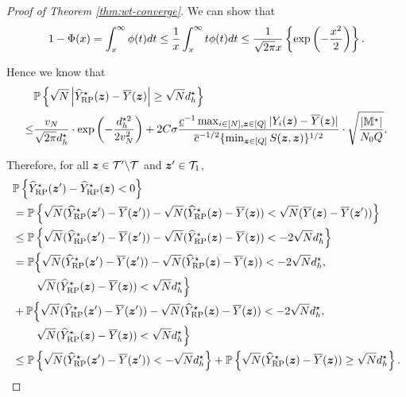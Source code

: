 \documentclass[12pt]{article}
\begin{document}
\begin{proof}[Proof of Theorem \ref{thm:wt-converge}]
We can show that 
\begin{align*}
    1-\Phi(x) = \int_x^\infty \phi(t) dt \le \frac{1}{x}\int_x^\infty t\phi(t) dt \le \frac{1}{\sqrt{2\pi}x}\left\{\exp\left(-\frac{x^2}{2}\right)\right\}.
\end{align*}

Hence we know that
\begin{align}\label{eqn:dev-bound}
       &{\mathbb{P}}\left\{\sqrt{N}\left|{\widehat{Y}}^\star_{\operatorname{RP}}({\boldsymbol{z}}) - \overline{Y}({\boldsymbol{z}})\right|\ge {\sqrt{N}d_h^\star} \right\}\notag\\
   \le    &\frac{v_N}{\sqrt{2\pi }d_h^\star}\cdot \exp\left(-\frac{ d_h^{\star 2}}{2v_N^2}\right) + 2C\sigma   \frac{ \underline{c}^{-1} \max_{i\in[N],{\boldsymbol{z}}\in[Q]}|Y_i({\boldsymbol{z}})-\overline{Y}({\boldsymbol{z}})|}{ {\overline{c}^{-1/2} \{\min_{{\boldsymbol{z}}\in[Q]} S({\boldsymbol{z}},{\boldsymbol{z}})}\}^{1/2}}\cdot \sqrt{\frac{|{\mathbb{M}}^\star|}{N_0Q}}.
\end{align}

Therefore, for all ${\boldsymbol{z}}\in{\mathcal{T}}'\backslash{\mathcal{T}}$ and ${\boldsymbol{z}}'\in{\mathcal{T}}_{1}$,
\begin{align*}
    &{\mathbb{P}}\left\{{\widehat{Y}}^\star_{\operatorname{RP}}({\boldsymbol{z}}') - {\widehat{Y}}^\star_{\operatorname{RP}}({\boldsymbol{z}})<0\right\} \\
    &= {\mathbb{P}}\left\{\sqrt{N}({\widehat{Y}}^\star_{\operatorname{RP}}({\boldsymbol{z}}') - \overline{Y}({\boldsymbol{z}}')) - \sqrt{N}({\widehat{Y}}^\star_{\operatorname{RP}}({\boldsymbol{z}}) - \overline{Y}({\boldsymbol{z}}))<\sqrt{N}(\overline{Y}({\boldsymbol{z}}) - \overline{Y}({\boldsymbol{z}}'))\right\} \\
    & \le {\mathbb{P}}\left\{\sqrt{N}({\widehat{Y}}^\star_{\operatorname{RP}}({\boldsymbol{z}}') - \overline{Y}({\boldsymbol{z}}')) - \sqrt{N}({\widehat{Y}}^\star_{\operatorname{RP}}({\boldsymbol{z}}) - \overline{Y}({\boldsymbol{z}}))<-2\sqrt{N}d_h^\star\right\} \\
    & = {\mathbb{P}}\Big\{\sqrt{N}({\widehat{Y}}^\star_{\operatorname{RP}}({\boldsymbol{z}}') - \overline{Y}({\boldsymbol{z}}')) - \sqrt{N}({\widehat{Y}}^\star_{\operatorname{RP}}({\boldsymbol{z}}) - \overline{Y}({\boldsymbol{z}}))<-2\sqrt{N}d_h^\star, \\
    &\phantom{hello}\sqrt{N}({\widehat{Y}}^\star_{\operatorname{RP}}({\boldsymbol{z}}) - \overline{Y}({\boldsymbol{z}}))< {\sqrt{N}d_h^\star}\Big\} \\
    & + {\mathbb{P}}\Big\{\sqrt{N}({\widehat{Y}}^\star_{\operatorname{RP}}({\boldsymbol{z}}') - \overline{Y}({\boldsymbol{z}}')) - \sqrt{N}({\widehat{Y}}^\star_{\operatorname{RP}}({\boldsymbol{z}}) - \overline{Y}({\boldsymbol{z}}))<-2\sqrt{N}d_h^\star, \\
    &\phantom{hello}\sqrt{N}({\widehat{Y}}^\star_{\operatorname{RP}}({\boldsymbol{z}}) - \overline{Y}({\boldsymbol{z}}))< {\sqrt{N}d_h^\star} \Big\} \\
    & \le {\mathbb{P}}\left\{\sqrt{N}({\widehat{Y}}^\star_{\operatorname{RP}}({\boldsymbol{z}}') - \overline{Y}({\boldsymbol{z}}')) < - {\sqrt{N}d_h^\star} \right\}
     + {\mathbb{P}}\left\{\sqrt{N}({\widehat{Y}}^\star_{\operatorname{RP}}({\boldsymbol{z}}) - \overline{Y}({\boldsymbol{z}}))\ge{\sqrt{N}d_h^\star}\right\}.
\end{align*}


\end{proof}
\end{document}
